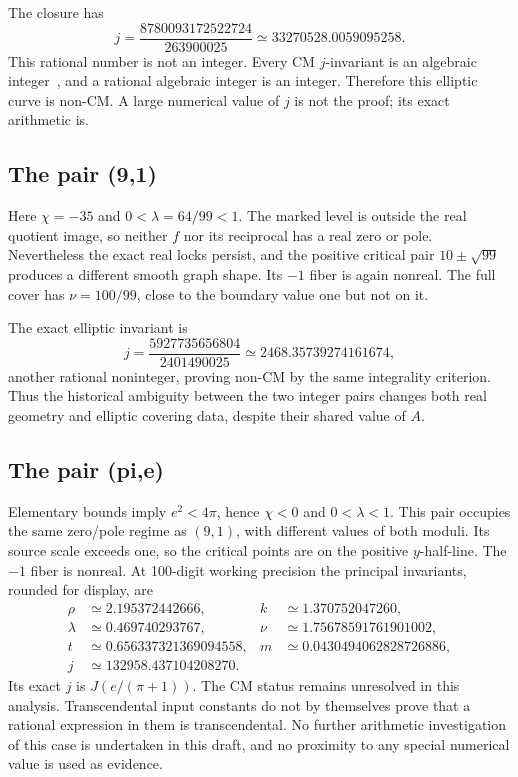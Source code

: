 The closure has
\[
j=\frac{8780093172522724}{263900025}
\simeq33270528.0059095258.
\]
This rational number is not an integer. Every CM \(j\)-invariant is an algebraic integer~\cite[Theorem 2.1]{DLR}, and a rational algebraic integer is an integer. Therefore this elliptic curve is non-CM. A large numerical value of \(j\) is not the proof; its exact arithmetic is.

\subsection{The pair (9,1)}
Here \(\chi=-35\) and \(0<\lambda=64/99<1\). The marked level is outside the real quotient image, so neither \(f\) nor its reciprocal has a real zero or pole. Nevertheless the exact real locks persist, and the positive critical pair \(10\pm\sqrt{99}\) produces a different smooth graph shape. Its \(-1\) fiber is again nonreal. The full cover has \(\nu=100/99\), close to the boundary value one but not on it.

The exact elliptic invariant is
\[
j=\frac{5927735656804}{2401490025}
\simeq2468.35739274161674,
\]
another rational noninteger, proving non-CM by the same integrality criterion. Thus the historical ambiguity between the two integer pairs changes both real geometry and elliptic covering data, despite their shared value of \(A\).

\subsection{The pair (pi,e)}
Elementary bounds imply \(e^2<4\pi\), hence \(\chi<0\) and \(0<\lambda<1\). This pair occupies the same zero/pole regime as \((9,1)\), with different values of both moduli. Its source scale exceeds one, so the critical points are on the positive \(y\)-half-line. The \(-1\) fiber is nonreal. At 100-digit working precision the principal invariants, rounded for display, are
\begin{align*}
\rho&\simeq2.195372442666,& k&\simeq1.370752047260,\\
\lambda&\simeq0.469740293767,&\nu&\simeq1.75678591761901002,\\
t&\simeq0.656337321369094558,&m&\simeq0.0430494062828726886,\\
j&\simeq132958.437104208270.&&
\end{align*}
Its exact \(j\) is \(J(e/(\pi+1))\). The CM status remains unresolved in this analysis. Transcendental input constants do not by themselves prove that a rational expression in them is transcendental. No further arithmetic investigation of this case is undertaken in this draft, and no proximity to any special numerical value is used as evidence.

